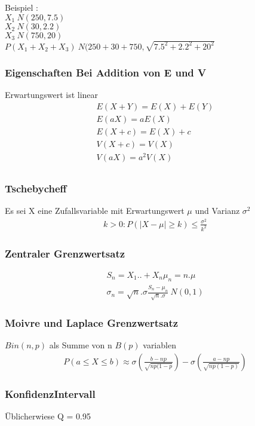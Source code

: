 \documentclass[landscape,twocolumn,a4paper]{article}
\begin{document}
Beispiel :\\
$ X_1 ~ N(250,7.5)$\\
$ X_2 ~ N(30,2.2)$ \\
$ X_3 ~ N(750,20)$ \\
$P(X_1+X_2+X_3) ~ N(250 +30 +750, \sqrt{7.5^2 + 2.2^2 + 20^2}$

\subsubsection*{Eigenschaften Bei Addition von E und V}
Erwartungswert ist linear
\begin{align}
 E(X + Y) = E(X) + E(Y)\\
 E (aX) = a E(X)\\
 E(X+c) = E(X) + c\\
 V(X + c) = V(X)\\
 V(aX) = a^2 V(X)\\
\end{align}

\subsubsection*{Tschebycheff}
Es sei X eine Zufallsvariable mit Erwartungswert $\mu$ und Varianz $\sigma^2$\\
\begin{align}
 k > 0 : P(|X-\mu| \ge k) \le \frac{\sigma^2}{k^2}
\end{align}


\subsubsection*{Zentraler Grenzwertsatz}
\begin{align}
  S_n = X_1 .. + X_n
  \mu_n = n.\mu \\
  \sigma_n = \sqrt{n}. \sigma
  \frac{S_n - \mu_n}{\sqrt{n}. \sigma} ~N(0,1)
\end{align}

\subsubsection*{Moivre und Laplace Grenzwertsatz}
$Bin(n,p)$ als Summe von n $B(p)$ variablen
\begin{align}
 P(a \le X \le b) \approx \sigma(\frac{b-np}{\sqrt{np(1-p}}) - \sigma(\frac{a-np}{\sqrt{np(1-p)}})
\end{align}
\subsubsection*{KonfidenzIntervall}
Üblicherwiese Q = 0.95\\
\end{document}
